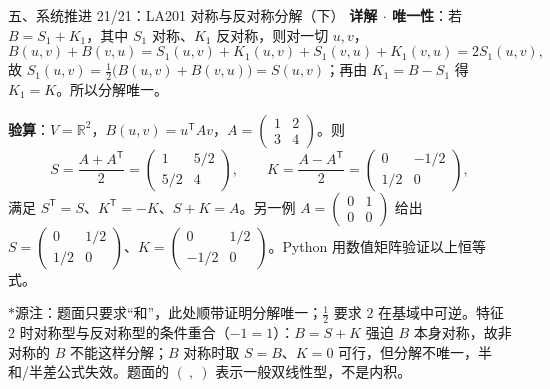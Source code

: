 \documentclass[aspectratio=169,10pt,fontset=none]{ctexbeamer}
\newcommand{\key}[1]{\textcolor{ink}{\bfseries #1}}
\newcommand{\starpt}{\textcolor{accent}{\bfseries$\ast$}}
\begin{document}
\begin{frame}[t]{五、系统推进 21/21：LA201 对称与反对称分解（下）}
\scriptsize
\key{详解 $\cdot$ 唯一性}：若 $B=S_1+K_1$，其中 $S_1$ 对称、$K_1$ 反对称，则对一切 $u,v$，
\[ B(u,v)+B(v,u)=S_1(u,v)+K_1(u,v)+S_1(v,u)+K_1(v,u)=2S_1(u,v), \]
故 $S_1(u,v)=\tfrac12\bigl(B(u,v)+B(v,u)\bigr)=S(u,v)$；再由 $K_1=B-S_1$ 得 $K_1=K$。所以分解唯一。

\key{验算}：$V=\mathbb R^2$，$B(u,v)=u^{\mathsf T}Av$，$A=\begin{pmatrix}1&2\\3&4\end{pmatrix}$。则
\[ S=\frac{A+A^{\mathsf T}}{2}=\begin{pmatrix}1&5/2\\5/2&4\end{pmatrix},\qquad K=\frac{A-A^{\mathsf T}}{2}=\begin{pmatrix}0&-1/2\\1/2&0\end{pmatrix}, \]
满足 $S^{\mathsf T}=S$、$K^{\mathsf T}=-K$、$S+K=A$。另一例 $A=\begin{pmatrix}0&1\\0&0\end{pmatrix}$ 给出 $S=\begin{pmatrix}0&1/2\\1/2&0\end{pmatrix}$、$K=\begin{pmatrix}0&1/2\\-1/2&0\end{pmatrix}$。Python 用数值矩阵验证以上恒等式。

\starpt 源注：题面只要求“和”，此处顺带证明分解唯一；$\tfrac12$ 要求 $2$ 在基域中可逆。特征 $2$ 时对称型与反对称型的条件重合（$-1=1$）：$B=S+K$ 强迫 $B$ 本身对称，故非对称的 $B$ 不能这样分解；$B$ 对称时取 $S=B$、$K=0$ 可行，但分解不唯一，半和/半差公式失效。题面的 $(\ ,\ )$ 表示一般双线性型，不是内积。
\end{frame}
\end{document}
